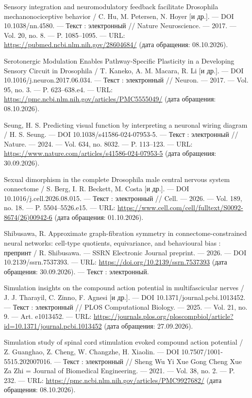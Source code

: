 \begin{list}{}{\setlength{\leftmargin}{10mm}\setlength{\labelwidth}{8mm}\setlength{\labelsep}{2mm}\setlength{\itemsep}{0pt}\setlength{\parsep}{0pt}\setlength{\topsep}{0pt}}
\item[248.] Sensory integration and neuromodulatory feedback facilitate Drosophila mechanonociceptive behavior / C. Hu, M. Petersen, N. Hoyer [и др.]. — DOI 10.1038/nn.4580. — Текст : электронный // Nature Neuroscience. — 2017. — Vol. 20, no. 8. — P. 1085–1095. — URL: \url{https://pubmed.ncbi.nlm.nih.gov/28604684/} (дата обращения: 08.10.2026).
\item[249.] Serotonergic Modulation Enables Pathway-Specific Plasticity in a Developing Sensory Circuit in Drosophila / T. Kaneko, A. M. Macara, R. Li [и др.]. — DOI 10.1016/j.neuron.2017.06.034. — Текст : электронный // Neuron. — 2017. — Vol. 95, no. 3. — P. 623–638.e4. — URL: \url{https://pmc.ncbi.nlm.nih.gov/articles/PMC5555049/} (дата обращения: 08.10.2026).
\item[250.] Seung, H. S. Predicting visual function by interpreting a neuronal wiring diagram / H. S. Seung. — DOI 10.1038/s41586-024-07953-5. — Текст : электронный // Nature. — 2024. — Vol. 634, no. 8032. — P. 113–123. — URL: \url{https://www.nature.com/articles/s41586-024-07953-5} (дата обращения: 30.09.2026).
\item[251.] Sexual dimorphism in the complete Drosophila male central nervous system connectome / S. Berg, I. R. Beckett, M. Costa [и др.]. — DOI 10.1016/j.cell.2026.08.015. — Текст : электронный // Cell. — 2026. — Vol. 189, no. 18. — P. 5504–5526.e15. — URL: \url{https://www.cell.com/cell/fulltext/S0092-8674(26)00942-6} (дата обращения: 01.10.2026).
\item[252.] Shibusawa, R. Approximate graph-fibration symmetry in connectome-constrained neural networks: cell-type quotients, equivariance, and behavioural bias : препринт / R. Shibusawa. — SSRN Electronic Journal preprint. — 2026. — DOI 10.2139/ssrn.7537393. — URL: \url{https://doi.org/10.2139/ssrn.7537393} (дата обращения: 30.09.2026). — Текст : электронный.
\item[253.] Simulation insights on the compound action potential in multifascicular nerves / J. J. Tharayil, C. Zinno, F. Agnesi [и др.]. — DOI 10.1371/journal.pcbi.1013452. — Текст : электронный // PLOS Computational Biology. — 2025. — Vol. 21, no. 9. — Art. e1013452. — URL: \url{https://journals.plos.org/ploscompbiol/article?id=10.1371/journal.pcbi.1013452} (дата обращения: 27.09.2026).
\item[254.] Simulation study of spinal cord stimulation evoked compound action potential / Z. Guanghao, Z. Cheng, W. Changzhe, H. Xiaolin. — DOI 10.7507/1001-5515.202007016. — Текст : электронный // Sheng Wu Yi Xue Gong Cheng Xue Za Zhi = Journal of Biomedical Engineering. — 2021. — Vol. 38, no. 2. — P. 232. — URL: \url{https://pmc.ncbi.nlm.nih.gov/articles/PMC9927682/} (дата обращения: 08.10.2026).

\end{list}
